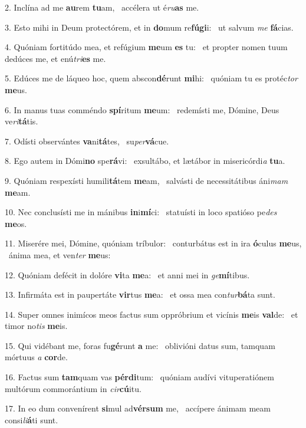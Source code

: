 2. Inclína ad me \textbf{au}rem \textbf{tu}am, \ast\  accélera ut é\textit{ru}\textbf{as} me.\

3. Esto mihi in Deum protectórem, et in \textbf{do}mum re\textbf{fú}\textbf{gi}i: \ast\  ut salvum \textit{me} \textbf{fá}cias.\

4. Quóniam fortitúdo mea, et refúgium \textbf{me}um \textbf{es} tu: \ast\  et propter nomen tuum dedúces me, et enú\textit{tri}\textbf{es} me.\

5. Edúces me de láqueo hoc, quem abscon\textbf{dé}runt \textbf{mi}hi: \ast\  quóniam tu es protéc\textit{tor} \textbf{me}us.\

6. In manus tuas comméndo \textbf{spí}ritum \textbf{me}um: \ast\  redemísti me, Dómine, Deus ve\textit{ri}\textbf{tá}tis.\

7. Odísti observántes \textbf{va}ni\textbf{tá}tes, \ast\  su\textit{per}\textbf{vá}cue.\

8. Ego autem in Dómi\textbf{no} spe\textbf{rá}vi: \ast\  exsultábo, et lætábor in misericórdi\textit{a} \textbf{tu}a.\

9. Quóniam respexísti humili\textbf{tá}tem \textbf{me}am, \ast\  salvásti de necessitátibus áni\textit{mam} \textbf{me}am.\

10. Nec conclusísti me in mánibus \textbf{in}i\textbf{mí}ci: \ast\  statuísti in loco spatióso pe\textit{des} \textbf{me}os.\

11. Miserére mei, Dómine, quóniam tríbulor: \dag\  conturbátus est in ira \textbf{ó}culus \textbf{me}us, \ast\  ánima mea, et ven\textit{ter} \textbf{me}us:\

12. Quóniam defécit in dolóre \textbf{vi}ta \textbf{me}a: \ast\  et anni mei in \textit{ge}\textbf{mí}tibus.\

13. Infirmáta est in paupertáte \textbf{vir}tus \textbf{me}a: \ast\  et ossa mea con\textit{tur}\textbf{bá}ta sunt.\

14. Super omnes inimícos meos factus sum oppróbrium et vicínis \textbf{me}is \textbf{val}de: \ast\  et timor no\textit{tis} \textbf{me}is.\

15. Qui vidébant me, foras fu\textbf{gé}runt \textbf{a} me: \ast\  oblivióni datus sum, tamquam mórtuus \textit{a} \textbf{cor}de.\

16. Factus sum \textbf{tam}quam vas \textbf{pér}\textbf{di}tum: \ast\  quóniam audívi vituperatiónem multórum commorántium in \textit{cir}\textbf{cú}itu.\

17. In eo dum convenírent \textbf{si}mul ad\textbf{vér}\textbf{sum} me, \ast\  accípere ánimam meam consi\textit{li}\textbf{á}ti sunt.\

